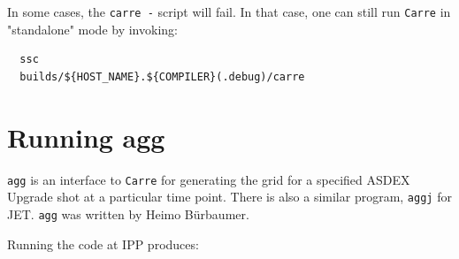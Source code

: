 \documentclass[a4paper,10pt]{report}
\begin{document}
In some cases, the {\tt carre -} script will fail. In that case, one can still
run {\tt Carre} in "standalone" mode by invoking:
\begin{verbatim}
  ssc
  builds/${HOST_NAME}.${COMPILER}(.debug)/carre
\end{verbatim}


\chapter{Running agg}
\label{cha:agg}

{\tt agg} is an interface to {\tt Carre} for generating the grid for
a specified ASDEX Upgrade shot at a particular time point.  There is
also a similar program, {\tt aggj} for JET. {\tt agg} was written
by Heimo B{\"u}rbaumer.

Running the code at IPP produces:
\end{document}
